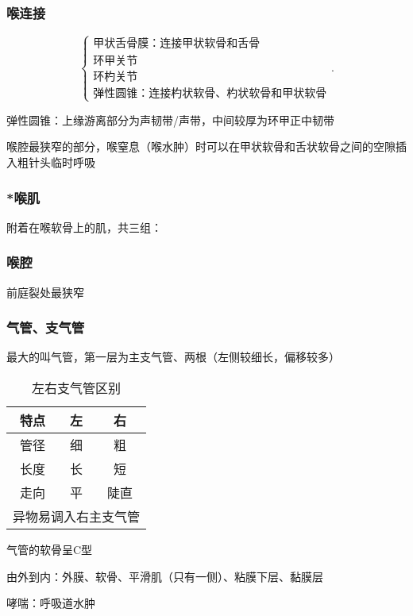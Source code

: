 \subsubsection*{喉连接}%
\label{subsub:喉连接}
\[
    \begin{cases}
        \text{甲状舌骨膜：连接甲状软骨和舌骨}\\
        \text{环甲关节}\\
        \text{环杓关节}\\
        \text{弹性圆锥：连接杓状软骨、杓状软骨和甲状软骨}
    \end{cases}
.\] 
\begin{notation}
    弹性圆锥：上缘游离部分为声韧带/声带，中间较厚为环甲正中韧带

    喉腔最狭窄的部分，喉窒息（喉水肿）时可以在甲状软骨和舌状软骨之间的空隙插入粗针头临时呼吸
\end{notation}
\subsubsection*{*喉肌}%
\label{subsub:-喉肌}
附着在喉软骨上的肌，共三组：
\subsubsection*{喉腔}%
\label{subsub:喉腔}
\begin{notation}
    前庭裂处最狭窄
\end{notation}
\subsubsection*{气管、支气管}%
\label{subsub:气管-支气管}
最大的叫气管，第一层为主支气管、两根（左侧较细长，偏移较多）
\begin{table}[htpb]
    \centering
    \caption{左右支气管区别}
    \label{tab:左右支气管区别}
    \begin{tabular}{ccc}
    \toprule
    特点 & 左 & 右\\
    \midrule
    管径 & 细 & 粗\\
    长度 & 长 & 短\\
    走向 & 平 & 陡直\\
    \multicolumn{3}{c}{异物易调入右主支气管} \\
    \bottomrule
    \end{tabular}
\end{table}
\begin{notation}    
    气管的软骨呈C型

    由外到内：外膜、软骨、平滑肌（只有一侧）、粘膜下层、黏膜层
\end{notation}
\begin{notation}
    哮喘：呼吸道水肿
\end{notation}
